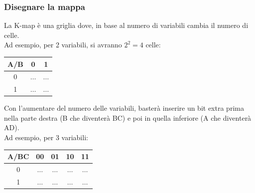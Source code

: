 \documentclass[12pt]{article}
\begin{document}
\subsubsection{Disegnare la mappa}
La K-map è una griglia dove, in base al numero di variabili cambia il numero di celle.\\
Ad esempio, per 2 variabili, si avranno $2^2 = 4$ celle:
\begin{center}
    \begin{tabular}{|| c | c c ||}
        \hline
        A/B & 0 & 1\\
        \hline
        0 & $\dots$ & $\dots$\\
        1 & $\dots$ & $\dots$\\
        \hline
    \end{tabular}
\end{center}
Con l'aumentare del numero delle variabili, basterà inserire un bit extra prima nella parte destra (B che diventerà BC) e poi in quella inferiore (A che diventerà AD).\\
Ad esempio, per 3 variabili:
\begin{center}
    \begin{tabular}{|| c | c c c c ||}
        \hline
        A/BC & 00 & 01 & 10 & 11\\
        \hline
        0 & $\dots$ & $\dots$ & $\dots$ & $\dots$\\
        \hline
        1 & $\dots$ & $\dots$ & $\dots$ & $\dots$\\
        \hline  
    \end{tabular}
\end{center}
\end{document}
